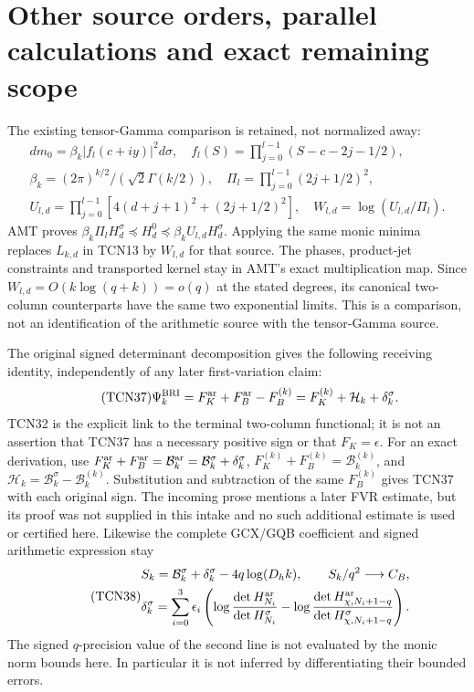 \documentclass[11pt,a4paper]{article}
\begin{document}
\section{Other source orders, parallel calculations and exact remaining scope}

The existing tensor-Gamma comparison is retained, not normalized away:
\begin{equation}\tag{TCN36}
 \begin{gathered}
 dm_0=\beta_k|f_l(c+iy)|^2d\sigma,
 \quad f_l(S)=\prod_{j=0}^{l-1}(S-c-2j-1/2),\\
 \beta_k=(2\pi)^{k/2}/(\sqrt2\Gamma(k/2)),\quad
 \Pi_l=\prod_{j=0}^{l-1}(2j+1/2)^2,\\
 U_{l,d}=\prod_{j=0}^{l-1}[4(d+j+1)^2+(2j+1/2)^2],\quad
 W_{l,d}=\log(U_{l,d}/\Pi_l).
 \end{gathered}
\end{equation}
AMT proves $\beta_k\Pi_l H_d^\sigma\preceq H_d^0\preceq
\beta_kU_{l,d}H_d^\sigma$. Applying the same monic minima
replaces $L_{k,d}$ in TCN13 by $W_{l,d}$ for that source.
The phases, product-jet constraints and transported kernel stay in
AMT's exact multiplication map. Since $W_{l,d}=O(k\log(q+k))=o(q)$
at the stated degrees, its canonical two-column counterparts have
the same two exponential limits. This is a comparison, not an
identification of the arithmetic source with the tensor-Gamma source.

The original signed determinant decomposition gives the following
receiving identity, independently of any later first-variation claim:
\begin{equation}\tag{TCN37}
 \Psi_k^{\rm BRI}=F_K^{\mathrm{ar}}+F_B^{\mathrm{ar}}-F_B^{(k)}
     =F_K^{(k)}+\mathcal H_k+\delta_k^\sigma.
\end{equation}
TCN32 is the explicit link to the terminal two-column functional;
it is not an assertion that TCN37 has a necessary positive sign or
that $F_K=\epsilon$. For an exact derivation, use
$F_K^{\mathrm{ar}}+F_B^{\mathrm{ar}}=\mathcal B_k^{\mathrm{ar}}
=\mathcal B_k^\sigma+\delta_k^\sigma$,
$F_K^{(k)}+F_B^{(k)}=\mathcal B_k^{(k)}$, and
$\mathcal H_k=\mathcal B_k^\sigma-\mathcal B_k^{(k)}$.
Substitution and subtraction of the same $F_B^{(k)}$ gives TCN37
with each original sign. The incoming prose mentions a later FVR
estimate, but its proof was not supplied in this intake and no such
additional estimate is used or certified here.
Likewise the complete GCX/GQB coefficient and signed arithmetic
expression stay
\begin{equation}\tag{TCN38}
 \begin{gathered}
 S_k=\mathcal B_k^\sigma+\delta_k^\sigma-4q\log(D_hk),
 \qquad S_k/q^2\longrightarrow C_B,\\
 \delta_k^\sigma=\sum_{i=0}^3\epsilon_i
 \left(\log\frac{\det H_{N_i}^{\mathrm{ar}}}{\det H_{N_i}^{\sigma}}
 -\log\frac{\det H_{\chi,N_i+1-q}^{\mathrm{ar}}}
                  {\det H_{\chi,N_i+1-q}^{\sigma}}\right).
 \end{gathered}
\end{equation}
The signed $q$-precision value of the second line is not evaluated
by the monic norm bounds here. In particular it is not inferred by
differentiating their bounded errors.
\end{document}
